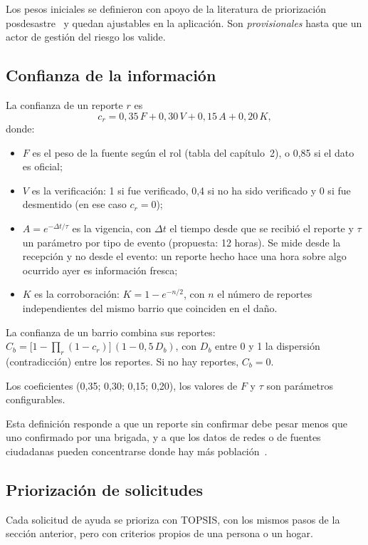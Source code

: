 Los pesos iniciales se definieron con apoyo de la literatura de priorización posdesastre~\cite{Sahin2023314,Chakraborty2016308} y quedan ajustables en la aplicación. Son \emph{provisionales} hasta que un actor de gestión del riesgo los valide.

\subsection{Confianza de la información}\label{sec:confianza}
\begin{description}[leftmargin=0pt]
  \item[RM-09 (\Must).] La confianza de un reporte $r$ es
  \begin{equation}
    c_r = 0{,}35\,F + 0{,}30\,V + 0{,}15\,A + 0{,}20\,K ,
  \end{equation}
  donde:
  \begin{itemize}
    \item $F$ es el peso de la fuente según el rol (tabla del capítulo~2), o 0,85 si el dato es oficial;
    \item $V$ es la verificación: 1 si fue verificado, 0,4 si no ha sido verificado y 0 si fue desmentido (en ese caso $c_r=0$);
    \item $A=e^{-\Delta t/\tau}$ es la vigencia, con $\Delta t$ el tiempo desde que se recibió el reporte y $\tau$ un parámetro por tipo de evento (propuesta: 12 horas). Se mide desde la recepción y no desde el evento: un reporte hecho hace una hora sobre algo ocurrido ayer es información fresca;
    \item $K$ es la corroboración: $K=1-e^{-n/2}$, con $n$ el número de reportes independientes del mismo barrio que coinciden en el daño.
  \end{itemize}
  \item[RM-10 (\Must).] La confianza de un barrio combina sus reportes: $C_b=\bigl[1-\prod_r (1-c_r)\bigr]\,(1-0{,}5\,D_b)$, con $D_b$ entre 0 y 1 la dispersión (contradicción) entre los reportes. Si no hay reportes, $C_b=0$.
  \item[RM-11 (\Must).] Los coeficientes (0,35; 0,30; 0,15; 0,20), los valores de $F$ y $\tau$ son parámetros configurables.
\end{description}
Esta definición responde a que un reporte sin confirmar debe pesar menos que uno confirmado por una brigada, y a que los datos de redes o de fuentes ciudadanas pueden concentrarse donde hay más población~\cite{Fan2020}.

\subsection{Priorización de solicitudes}\label{sec:solicitudes}
Cada solicitud de ayuda se prioriza con TOPSIS, con los mismos pasos de la sección anterior, pero con criterios propios de una persona o un hogar.

